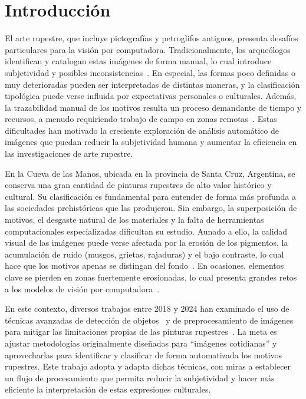 \chapter{Introducción}

El arte rupestre, que incluye pictografías y petroglifos antiguos, presenta desafíos particulares para la visión por computadora.
Tradicionalmente, los arqueólogos identifican y catalogan estas imágenes de forma manual, lo cual introduce subjetividad y posibles inconsistencias~\cite{horn2022,suhaimi2023}.
En especial, las formas poco definidas o muy deterioradas pueden ser interpretadas de distintas maneras, y la clasificación tipológica puede verse influida por expectativas personales o culturales.
Además, la trazabilidad manual de los motivos resulta un proceso demandante de tiempo y recursos, a menudo requiriendo trabajo de campo en zonas remotas~\cite{horn2022,suhaimi2023}.
Estas dificultades han motivado la creciente exploración de análisis automático de imágenes que puedan reducir la subjetividad humana y aumentar la eficiencia en las investigaciones de arte rupestre.

En la Cueva de las Manos, ubicada en la provincia de Santa Cruz, Argentina, se conserva una gran cantidad de pinturas rupestres de alto valor histórico y cultural.
Su clasificación es fundamental para entender de forma más profunda a las sociedades prehistóricas que las produjeron.
Sin embargo, la superposición de motivos, el desgaste natural de los materiales y la falta de herramientas computacionales especializadas dificultan su estudio.
Aunado a ello, la calidad visual de las imágenes puede verse afectada por la erosión de los pigmentos, la acumulación de ruido (musgos, grietas, rajaduras) y el bajo contraste, lo cual hace que los motivos apenas se distingan del fondo~\cite{jalandoni2022,suhaimi2023}.
En ocasiones, elementos clave se pierden en zonas fuertemente erosionadas, lo cual presenta grandes retos a los modelos de visión por computadora~\cite{horn2022}.

En este contexto, diversos trabajos entre 2018 y 2024 han examinado el uso de técnicas avanzadas de detección de objetos~\cite{yolov5,ren2015faster,lin2017focal,zhu2021} y de preprocesamiento de imágenes~\cite{zuiderveld1994contrast,tomasi1998bilateral,adobe_unsharp_masking,burt1983laplacian} para mitigar las limitaciones propias de las pinturas rupestres~\cite{horn2022,alvarez2021,suhaimi2023}.
La meta es ajustar metodologías originalmente diseñadas para “imágenes cotidianas” y aprovecharlas para identificar y clasificar de forma automatizada los motivos rupestres.
Este trabajo adopta y adapta dichas técnicas, con miras a establecer un flujo de procesamiento que permita reducir la subjetividad y hacer más eficiente la interpretación de estas expresiones culturales.

